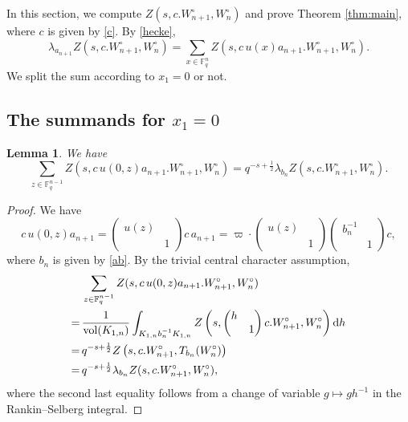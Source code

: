 \documentclass[11pt, a4paper]{amsart}
\newcommand{\od}{\operatorname{d}}
\newcommand{\be}{\begin {equation}}
\newcommand{\ee}{\end {equation}}
\theoremstyle{plain}
\theoremstyle{plain}
\theoremstyle{plain}
\newtheorem{leml}[lem]{Lemma}
\theoremstyle{plain}
\theoremstyle{remark}
\theoremstyle{definition}
\theoremstyle{plain}
\numberwithin{equation}{section}
\begin{document}
In this section, we compute $Z(s, c.W_{n+1}^\circ, W_n^\circ)$ and prove Theorem \ref{thm:main}, where $c$ is given by \eqref{c}.  By \eqref{hecke}, 
\be \label{sum2}
\lambda_{a_{n+1}} Z(s, c.W_{n+1}^\circ, W_n^\circ) = \sum_{x\in \mathbb{F}_q^n}Z(s, c \, u(x)a_{n+1}. W_{n+1}^\circ, W_n^\circ).
\ee
We split the sum according to $x_1=0$ or not.

\subsection{The summands for $x_1=0$}

\begin{leml} \label{x1=0}
We have 
\[
\sum_{z\in \mathbb{F}_q^{n-1}} Z(s, c\, u(0,z) a_{n+1}.W_{n+1}^\circ, W_n^\circ) = q^{-s+\frac{1}{2}}\lambda_{b_n} Z(s, c. W_{n+1}^\circ, W_n^\circ).
\]
\end{leml}

\begin{proof}
We have 
\[
c \, u(0,z)a_{n+1} = \begin{pmatrix} u(z) \\ & 1\end{pmatrix} c\, a_{n+1} = \varpi \cdot  \begin{pmatrix} u(z) \\ & 1\end{pmatrix} \begin{pmatrix} b_n^{-1} \\ & 1\end{pmatrix} c,
\]
where $b_n$ is given by \eqref{ab}. 
By the trivial central character assumption, 
\[
\begin{aligned}
 & \sum_{z\in \mathbb{F}_q^{n-1}} Z(s, c\, u(0,z) a_{n+1}.W_{n+1}^\circ, W_n^\circ)  \\
 =\, &  \frac{1}{{\rm vol}(K_{1,n})} \int_{K_{1,n} b_n^{-1} K_{1,n} } Z\left(s, \begin{pmatrix} h \\ & 1\end{pmatrix}c.W_{n+1}^\circ, W_n^\circ\right)\od\! h \\
 =\, & q^{-s+\frac{1}{2}} Z\left(s, c.W_{n+1}^\circ, T_{b_n}(W_n^\circ)\right) \\
 =\, & q^{-s+\frac{1}{2}}\lambda_{b_n} Z(s, c. W_{n+1}^\circ, W_n^\circ),
\end{aligned} 
\]
where the second last equality follows from a change of variable $g\mapsto gh^{-1}$ in the Rankin--Selberg integral. 
\end{proof}
\end{document}
